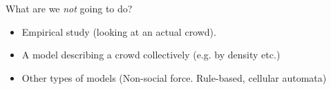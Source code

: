 \documentclass{beamer}
\begin{document}
\begin{frame}{What are we \emph{not} going to do?}
    \begin{itemize}
        \item Empirical study (looking at an actual crowd).
        \item A model describing a crowd collectively (e.g. by density etc.)
        \item Other types of models (Non-social force. Rule-based, cellular 
            automata)
    \end{itemize}
\end{frame}
\end{document}
